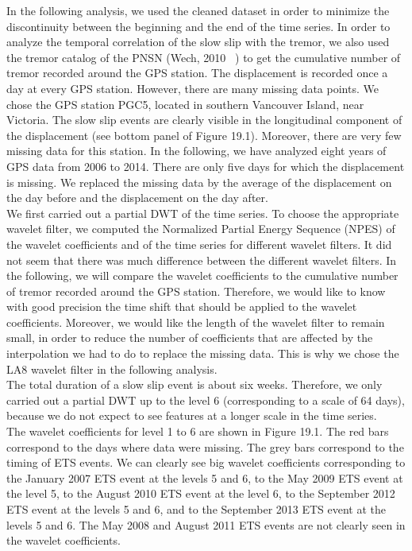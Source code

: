 \documentclass[main.tex]{subfiles}
\begin{document}
In the following analysis, we used the cleaned dataset in order to minimize the discontinuity between the beginning and the end of the time series. In order to analyze the temporal correlation of the slow slip with the tremor, we also used the tremor catalog of the PNSN (Wech, 2010 ~\cite{WEC_2010}) to get the cumulative number of tremor recorded around the GPS station. The displacement is recorded once a day at every GPS station. However, there are many missing data points. We chose the GPS station PGC5, located in southern Vancouver Island, near Victoria. The slow slip events are clearly visible in the longitudinal component of the displacement (see bottom panel of Figure 19.1). Moreover, there are very few missing data for this station. In the following, we have analyzed eight years of GPS data from 2006 to 2014. There are only five days for which the displacement is missing. We replaced the missing data by the average of the displacement on the day before and the displacement on the day after. \\

We first carried out a partial DWT of the time series. To choose the appropriate wavelet filter, we computed the Normalized Partial Energy Sequence (NPES) of the wavelet coefficients and of the time series for different wavelet filters. It did not seem that there was much difference between the different wavelet filters. In the following, we will compare the wavelet coefficients to the cumulative number of tremor recorded around the GPS station. Therefore, we would like to know with good precision the time shift that should be applied to the wavelet coefficients. Moreover, we would like the length of the wavelet filter to remain small, in order to reduce the number of coefficients that are affected by the interpolation we had to do to replace the missing data. This is why we chose the LA8 wavelet filter in the following analysis. \\

The total duration of a slow slip event is about six weeks. Therefore, we only carried out a partial DWT up to the level 6 (corresponding to a scale of 64 days), because we do not expect to see features at a longer scale in the time series. \\

The wavelet coefficients for level 1 to 6 are shown in Figure 19.1. The red bars correspond to the days where data were missing. The grey bars correspond to the timing of ETS events.  We can clearly see big wavelet coefficients corresponding to the January 2007 ETS event at the levels 5 and 6, to the May 2009 ETS event at the level 5, to the August 2010 ETS event at the level 6, to the September 2012 ETS event at the levels 5 and 6, and to the September 2013 ETS event at the levels 5 and 6.  The May 2008 and August 2011 ETS events are not clearly seen in the wavelet coefficients. \\
\end{document}

